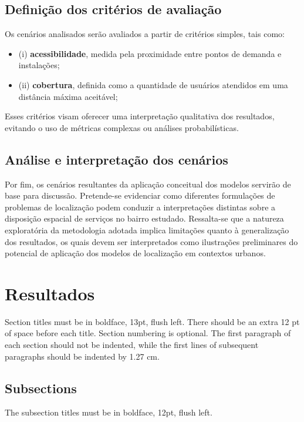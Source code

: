 \documentclass[12pt]{article}
\begin{document}
\subsection{Definição dos critérios de avaliação}

Os cenários analisados serão avaliados a partir de critérios simples, tais como: 
\begin{itemize} 
\item (i) \textbf{acessibilidade}, medida pela proximidade entre pontos de demanda e instalações;
\item (ii) \textbf{cobertura}, definida como a quantidade de usuários atendidos em uma distância máxima aceitável;
\end{itemize}
Esses critérios visam oferecer uma interpretação qualitativa dos resultados, evitando o uso de métricas complexas ou análises probabilísticas.

\subsection{Análise e interpretação dos cenários}

Por fim, os cenários resultantes da aplicação conceitual dos modelos servirão de base para discussão. Pretende-se evidenciar como diferentes formulações de problemas de localização podem conduzir a interpretações distintas sobre a disposição espacial de serviços no bairro estudado. Ressalta-se que a natureza exploratória da metodologia adotada implica limitações quanto à generalização dos resultados, os quais devem ser interpretados como ilustrações preliminares do potencial de aplicação dos modelos de localização em contextos urbanos.

\section{Resultados}

Section titles must be in boldface, 13pt, flush left. There should be an extra
12 pt of space before each title. Section numbering is optional. The first
paragraph of each section should not be indented, while the first lines of
subsequent paragraphs should be indented by 1.27 cm.

\subsection{Subsections}

The subsection titles must be in boldface, 12pt, flush left.
\end{document}
